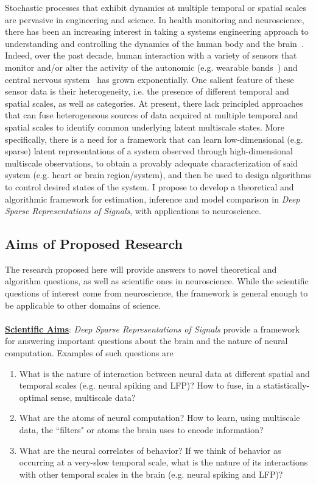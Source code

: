\documentclass[12pt]{article}
\begin{document}
Stochastic processes that exhibit dynamics at multiple temporal or spatial
scales are pervasive in engineering and science. In health monitoring and neuroscience, there has been an increasing interest in taking a systems engineering approach to understanding and controlling the dynamics of the human body and the brain~\cite{kim2011epidermal2,liberman2013closed}. Indeed, over the past decade, human interaction with a variety of sensors that monitor and/or alter the activity of the autonomic (e.g. wearable bands~\cite{savage2015mobile}) and central nervous system~\cite{sejnowski2014putting} has grown exponentially. One salient feature of these sensor data is their heterogeneity, i.e. the presence of different temporal and spatial scales, as well as categories. At present, there lack principled approaches that
can fuse heterogeneous sources of data acquired at multiple temporal and spatial scales to identify
common underlying latent multiscale states. More specifically, there is a need for a framework that can learn low-dimensional (e.g. sparse) latent representations of a system observed through high-dimensional multiscale observations, to obtain a provably adequate characterization of said system (e.g. heart or brain region/system), and then be used to design algorithms to control desired states of the system. I propose to develop a theoretical and algorithmic framework for estimation, inference and model comparison in \emph{Deep Sparse Representations of Signals}, with applications to neuroscience. 

\subsection*{Aims of Proposed Research}

The research proposed here will provide answers to novel theoretical and algorithm questions, as well as scientific ones in neuroscience. While the scientific questions of interest come from neuroscience, the framework is general enough to be applicable to other domains of science.
\\
\\
\noindent \textbf{\underline{Scientific Aims}}: \emph{Deep Sparse Representations of Signals} provide a framework for answering important questions about the brain and the nature of neural computation. Examples of such questions are
\begin{enumerate}
	\item What is the nature of interaction between neural data at different spatial and temporal scales (e.g. neural spiking and LFP)? How to fuse, in a statistically-optimal sense, multiscale data?
	\item What are the atoms of neural computation? How to learn, using multiscale data, the ``filters" or atoms the brain uses to encode information?
	\item What are the neural correlates of behavior? If we think of behavior as occurring at a very-slow temporal scale, what is the nature of its interactions with other temporal scales in the brain (e.g. neural spiking and LFP)?
\end{enumerate}
\end{document}
